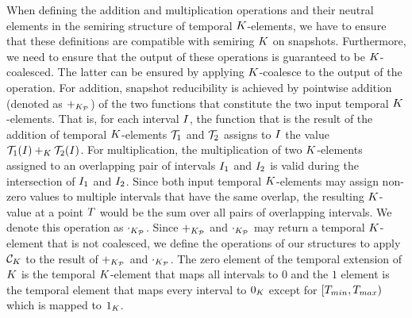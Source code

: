 When defining the addition and multiplication operations and their
neutral elements in the semiring structure of temporal
$K$-elements, we have to ensure that these definitions are
compatible with semiring $K$ on snapshots. Furthermore, we need to
ensure that the output of these operations is guaranteed to be $K$-coalesced. The latter can be ensured by applying $K$-coalesce to
the output of the operation. For addition, snapshot reducibility
is achieved by pointwise addition (denoted as $+_{K_{\mathcal{P}}}$)
of the two functions that constitute the two input temporal
$K$-elements. That is, for each interval $I$, the function
that is the result of the addition of temporal $K$-elements $\mathcal{T}_1$ and
$\mathcal{T}_2$ assigns to $I$ the value
$\mathcal{T}_1(I) +_{K} \mathcal{T}_2(I)$. For
multiplication, the multiplication of two $K$-elements assigned to
an overlapping pair of intervals $I_1$ and $I_2$ is
valid during the intersection of $I_1$ and
$I_2$. Since both input temporal $K$-elements may assign non-zero
values to multiple intervals that have the same overlap, the resulting
$K$-value at a point $T$ would be the sum over all pairs of
overlapping intervals. We denote this operation as $\cdot_{K_{\mathcal{P}}}$. Since
$+_{K_{\mathcal{P}}}$ and $\cdot_{K_{\mathcal{P}}}$ may return a temporal $K$-element that is not
coalesced, we define the operations of our structures to apply
$\mathcal{C}_{{K}}$ to the result of $+_{K_{\mathcal{P}}}$ and $\cdot_{K_{\mathcal{P}}}$.  The zero
element of the temporal extension of $K$ is the temporal $K$-element
that maps all intervals to $0$ and the $1$ element is the temporal
element that maps every interval to $0_{K}$ except for
$[T_{min}, T_{max})$ which is mapped to $1_{K}$.


